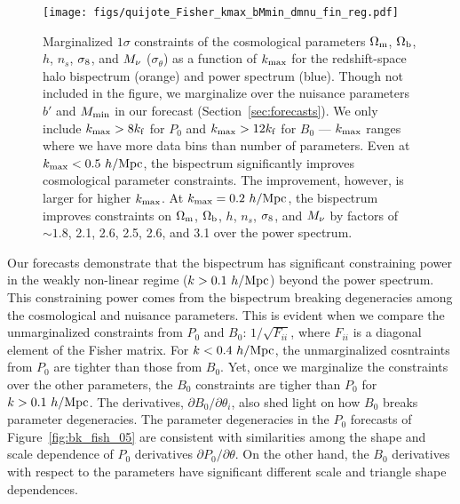 \begin{figure}
\begin{center}
    \texttt{[image: figs/quijote\_Fisher\_kmax\_bMmin\_dmnu\_fin\_reg.pdf]} 
    \caption{Marginalized $1\sigma$ constraints of the cosmological parameters 
    $\Omega_{\rm m}$, $\Omega_{\rm b}$, $h$, $n_s$, $\sigma_8$, and $M_\nu$ ($\sigma_\theta$) as a function 
    of $k_{\rm max}$ for the redshift-space halo bispectrum (orange) and power spectrum (blue). 
    Though not included in the figure, we marginalize over the nuisance parameters
    $b'$ and $M_{\rm min}$ in our forecast (Section~\ref{sec:forecasts}). We only 
    include $k_{\rm max} > 8 k_{\rm f}$ for $P_0$ and $k_{\rm max} > 12 k_{\rm f}$ 
    for $B_0$ --- $k_{\rm max}$ ranges where we have more data bins than number of 
    parameters. Even at $k_{\rm max} < 0.5~h/{\rm Mpc}$, the bispectrum significantly 
    improves cosmological parameter constraints. The improvement, however, is larger 
    for higher $k_{\rm max}$. At $k_{\rm max} = 0.2~h/{\rm Mpc}$, the bispectrum 
    improves constraints on $\Omega_{\rm m}$, $\Omega_{\rm b}$, $h$, $n_s$, $\sigma_8$, and $M_\nu$ by factors 
    of $\sim 1.8$, 2.1, 2.6, 2.5, 2.6, and 3.1 over the power spectrum.}
\label{fig:fish_kmax}
\end{center}
\end{figure}
Our forecasts demonstrate that the bispectrum has significant constraining power 
in the weakly non-linear regime ($k > 0.1~h/{\rm Mpc}$) beyond the power spectrum. This constraining power 
comes from the bispectrum breaking degeneracies among the cosmological and 
nuisance parameters. This is evident when we compare the unmarginalized 
constraints from $P_0$ and $B_0$: $1/\sqrt{F_{ii}}$, where $F_{ii}$ is a 
diagonal element of the Fisher matrix. For $k < 0.4~h/{\rm Mpc}$, the unmarginalized 
cosntraints from $P_0$ are tighter than those from $B_0$. Yet, once we 
marginalize the constraints over the other parameters, the $B_0$ constraints 
are tigher than $P_0$ for $k > 0.1~h/{\rm Mpc}$. The derivatives, 
$\partial B_0/\partial \theta_i$, also shed light on how $B_0$ breaks parameter 
degeneracies. The parameter degeneracies in the $P_0$ forecasts of Figure~\ref{fig:bk_fish_05} 
are consistent with similarities among the shape and scale dependence of 
$P_0$ derivatives $\partial P_0/\partial \theta$. On the other hand, the 
$B_0$ derivatives with respect to the parameters have significant different 
scale and triangle shape dependences.  


